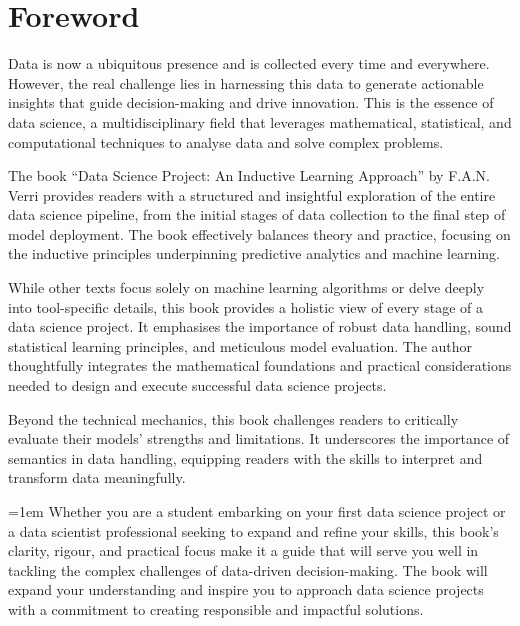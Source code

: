 \chapter{Foreword}


Data is now a ubiquitous presence and is collected every time and everywhere. However, the
real challenge lies in harnessing this data to generate actionable insights that guide
decision-making and drive innovation. This is the essence of data science, a
multidisciplinary field that leverages mathematical, statistical, and computational
techniques to analyse data and solve complex problems.

The book ``Data Science Project: An Inductive Learning Approach'' by F.A.N. Verri provides
readers with a structured and insightful exploration of the entire data science pipeline,
from the initial stages of data collection to the final step of model deployment. The book
effectively balances theory and practice, focusing on the inductive principles
underpinning predictive analytics and machine learning.

While other texts focus solely on machine learning algorithms or delve deeply into
tool-specific details, this book provides a holistic view of every stage of a data science
project. It emphasises the importance of robust data handling, sound statistical learning
principles, and meticulous model evaluation. The author thoughtfully integrates the
mathematical foundations and practical considerations needed to design and execute
successful data science projects.

Beyond the technical mechanics, this book challenges
readers to critically evaluate their models' strengths and limitations. It underscores the
importance of semantics in data handling, equipping readers with the skills to interpret
and transform data meaningfully.

\begin{sloppypar}
\emergencystretch=1em
Whether you are a student embarking on your first data science project or a data scientist
professional seeking to expand and refine your skills, this book's clarity, rigour, and
practical focus make it a guide that will serve you well in tackling the complex
challenges of data-driven decision-making. The book will expand your understanding and
inspire you to approach data science projects with a commitment to creating responsible
and impactful solutions.
\end{sloppypar}

